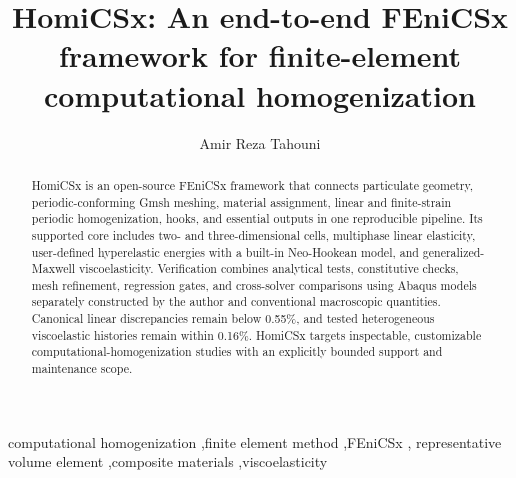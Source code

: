 \documentclass[preprint,12pt]{elsarticle}
\begin{document}
\begin{frontmatter}

\title{HomiCSx: An end-to-end FEniCSx framework for finite-element computational homogenization}

\author{Amir Reza Tahouni}
\address{Independent researcher, Tehran, Iran}

\begin{abstract}
HomiCSx is an open-source FEniCSx framework that connects particulate geometry,
periodic-conforming Gmsh meshing, material assignment, linear and finite-strain
periodic homogenization, hooks, and essential outputs in one reproducible
pipeline. Its supported core includes two- and three-dimensional cells,
multiphase linear elasticity, user-defined hyperelastic energies with a
built-in Neo-Hookean model, and generalized-Maxwell viscoelasticity.
Verification combines analytical tests, constitutive checks, mesh refinement,
regression gates, and cross-solver comparisons using Abaqus models separately
constructed by the author and conventional
macroscopic quantities. Canonical linear discrepancies remain below 0.55\%, and
tested heterogeneous viscoelastic histories remain within 0.16\%. HomiCSx
targets inspectable, customizable computational-homogenization studies with an
explicitly bounded support and maintenance scope.
\end{abstract}

\begin{keyword}
computational homogenization \sep finite element method \sep FEniCSx \sep
representative volume element \sep composite materials \sep viscoelasticity
\end{keyword}

\end{frontmatter}
\end{document}

